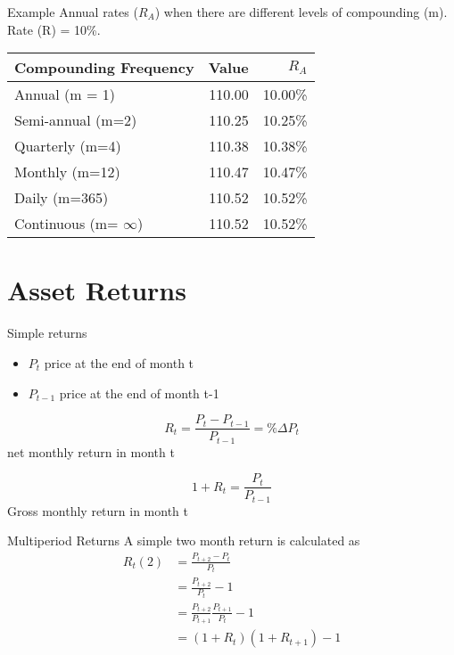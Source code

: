\documentclass[14pt,xcolor=pdftex,dvipsnames,table]{beamer}
\begin{document}
\begin{frame}{Example}
Annual rates ($R_A$) when there are different levels of compounding (m).  Rate (R) = 10\%.  
\begin{center}
 \begin{tabular}{l | r |r}
Compounding Frequency & Value  & $R_A$\\
\hline
Annual (m = 1) & 110.00 & 10.00\%\\	
Semi-annual (m=2) & 110.25 & 10.25\%\\
Quarterly (m=4) & 110.38 & 10.38\%\\
Monthly (m=12) & 110.47 & 10.47\%\\
Daily (m=365) & 110.52 & 10.52\%\\
Continuous (m= $\infty$) & 110.52 & 10.52\%\\
\hline
\end{tabular}
\end{center}
\end{frame} 



\section{Asset Returns}
\begin{frame}{Simple returns}
\begin{itemize}
\item $P_t$ price at the end of month t
\item $P_{t-1}$ price at the end of month t-1
\end{itemize}
\begin{equation}
R_t=\frac{P_t - P_{t-1}}{P_{t-1}}=\% \Delta P_t
\end{equation}
net monthly return in month t

\begin{equation}
1+R_t=\frac{P_t}{P_{t-1}}
\end{equation}
Gross monthly return in month t
\end{frame}

\begin{frame}{Multiperiod Returns}
A simple two month return is calculated as 
\begin{align*}
R_t(2) & =\frac{P_{t+2}-P_t}{P_t}\\
&= \frac{P_{t+2}}{P_t} -1\\
& = \frac{P_{t+2}}{P_{t+1}}\frac{P_{t+1}}{P_t} -1\\
&= (1+R_t)(1+R_{t+1})-1
\end{align*}
\end{frame}
\end{document}
